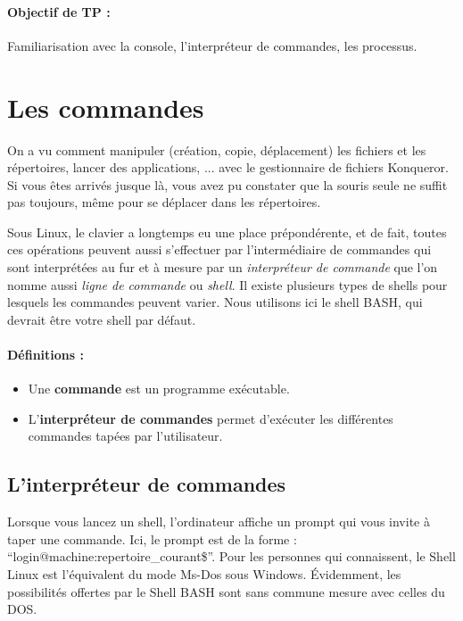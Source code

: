 \documentclass[12pt,a4paper]{article}
\begin{document}


\newcommand{\puis}{\ensuremath{\rightarrow\ }}


\paragraph{Objectif de TP :\\}

Familiarisation avec la console, l'interpréteur de commandes, les processus.

\section{Les commandes}

   On a vu comment manipuler (création, copie, déplacement) les
   fichiers et les répertoires, lancer des applications, ... avec le
   gestionnaire de fichiers Konqueror. Si vous êtes arrivés jusque là,
   vous avez pu constater que la souris seule ne suffit pas toujours,
   même pour se déplacer dans les répertoires.

   Sous Linux, le clavier a longtemps eu une place prépondérente, et
   de fait, toutes ces opérations peuvent
   aussi s'effectuer par l'intermédiaire de commandes qui sont
   interprétées au fur et à mesure par un \emph{interpréteur de commande} que
   l'on nomme aussi \emph{ligne de commande} ou \emph{shell}. Il existe
   plusieurs types de shells pour lesquels les commandes peuvent
   varier. Nous utilisons ici le shell BASH, qui devrait être votre
   shell par défaut.



   \paragraph{Définitions :\\}

   \begin{itemize}
   \item Une {\bf commande} est un programme exécutable.

   \item L'{\bf interpréteur de commandes} permet d'exécuter les
     différentes commandes tapées par l'utilisateur.
   \end{itemize}


\subsection{L'interpréteur de commandes}
   Lorsque vous lancez un shell, l'ordinateur affiche un prompt qui
   vous invite à taper une commande. Ici, le prompt est de la forme :
   ``login@machine:repertoire\_courant\$''. Pour les personnes qui
   connaissent, le Shell Linux est l'équivalent du mode Ms-Dos sous
   Windows. Évidemment, les possibilités offertes par le Shell BASH
   sont sans commune mesure avec celles du DOS.
\end{document}
